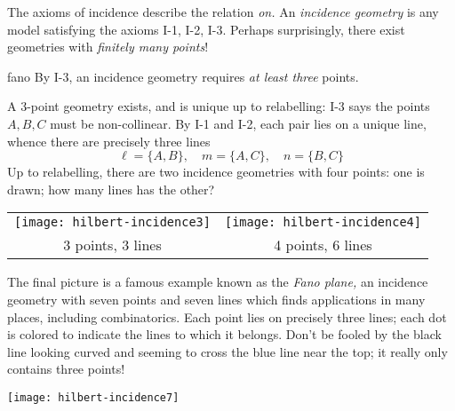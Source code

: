 \pagebreak



The axioms of incidence describe the relation \emph{on.} An \emph{incidence geometry} is any model satisfying the axioms I-1, I-2, I-3. Perhaps surprisingly, there exist geometries with \emph{finitely many points}!

\begin{examples}{}{fano}
	By I-3, an incidence geometry requires \emph{at least three} points.\par
	\begin{minipage}[t]{0.62\linewidth}\vspace{-5pt}
		A 3-point geometry exists, and is unique up to relabelling:\smallbreak
		I-3 says the points $A,B,C$ must be non-collinear. By I-1 and I-2, each pair lies on a unique line, whence there are precisely three lines
		\[
			\ell=\{A,B\},\quad m=\{A,C\},\quad n=\{B,C\}
		\]
		Up to relabelling, there are two incidence geometries with four points: one is drawn; how many lines has the other?
	\end{minipage}
	\hfill
	\begin{minipage}[t]{0.37\linewidth}\vspace{-15pt}
		\flushright
		\begin{tabular}{cc@{}}
			\texttt{[image: hilbert-incidence3]}
			&
			\texttt{[image: hilbert-incidence4]}\\
			3 points, 3 lines
			&
			4 points, 6 lines%
		\end{tabular}
	\end{minipage}
	\smallbreak
	\begin{minipage}[t]{0.72\linewidth}\vspace{0pt}
		The final picture is a famous example known as the \emph{Fano plane,} an incidence geometry with seven points and seven lines which finds applications in many places, including combinatorics. Each point lies on precisely three lines; each dot is colored to indicate the lines to which it belongs. Don't be fooled by the black line looking curved and seeming to cross the blue line near the top; it really only contains three points!
	\end{minipage}
	\hfill
	\begin{minipage}[t]{0.27\linewidth}\vspace{-17pt}
		\flushright
		\texttt{[image: hilbert-incidence7]}
	\end{minipage}
\end{examples}

